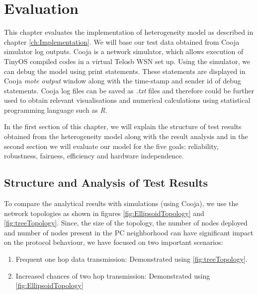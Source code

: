 \chapter{Evaluation}\label{ch: Design}

This chapter evaluates the implementation of heterogeneity model as described in chapter \ref{ch:Implementation}. We will base our test data obtained from Cooja simulator log outputs. Cooja is a network simulator, which allows execution of TinyOS compiled codes in a virtual Telosb \ac{WSN} set up. Using the simulator, we can debug the model using print statements. These statements are displayed in Cooja \textit{mote output} window along with the time-stamp and sender id of debug statements. Cooja log files can be saved as \textit{.txt} files and therefore could be further used to obtain relevant visualisations and numerical calculations using statistical programming language such as \textit{R}.  

\par
In the first section of this chapter, we will explain the structure of test results obtained from the heterogeneity model along with the result analysis and in the second section we will evaluate our model for the five goals: reliability, robustness, fairness, efficiency and hardware independence.

\section{Structure and Analysis of Test Results}

To compare the analytical results with simulations (using Cooja), we use the network topologies as shown in figures \ref{fig:EllipsoidTopology} and \ref{fig:treeTopology}. Since, the size of the topology, the number of nodes deployed and number of nodes present in the \ac{PC} neighborhood can have significant impact on the protocol behaviour, we have focused on two important scenarios: 

\begin{enumerate}
    \item Frequent one hop data transmission: Demonstrated using \ref{fig:treeTopology}.
    
    \item Increased chances of two hop transmission: Demonstrated using \ref{fig:EllipsoidTopology}
    
\end{enumerate}

